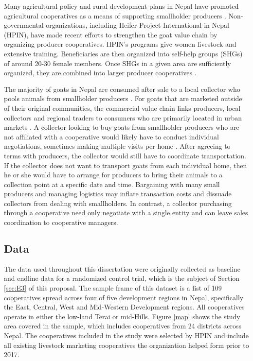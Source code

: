\documentclass[11pt]{article}
\begin{document}
Many agricultural policy and rural development plans in Nepal have promoted agricultural cooperatives as a means of supporting smallholder producers \citep{ADS15}. Non-governmental organizations, including Heifer Project International in Nepal (HPIN), have made recent efforts to strengthen the goat value chain by organizing producer cooperatives. HPIN’s programs give women livestock and extensive training. Beneficiaries are then organized into self-help groups (SHGs) of around 20-30 female members. Once SHGs in a given area are sufficiently organized, they are combined into larger producer cooperatives \citep{janzen-et.al.18}.

The majority of goats in Nepal are consumed after sale to a local collector who pools animals from smallholder producers \citep{HI-N12}. For goats that are marketed outside of their original communities, the commercial value chain links producers, local collectors and regional traders to consumers who are primarily located in urban markets \citep{HI-N12}. A collector looking to buy goats from smallholder producers who are not affiliated with a cooperative would likely have to conduct individual negotiations, sometimes making multiple visits per home \citep{HI-N12, staal-et.al.97}. After agreeing to terms with producers, the collector would still have to coordinate transportation. If the collector does not want to transport goats from each individual home, then he or she would have to arrange for producers to bring their animals to a collection point at a specific date and time. Bargaining with many small producers and managing logistics may inflate transaction costs and dissuade collectors from dealing with smallholders. In contrast, a collector purchasing through a cooperative need only negotiate with a single entity and can leave sales coordination to cooperative managers.

\subsection{Data} \label{sec:data}
The data used throughout this dissertation were originally collected as baseline and endline data for a randomized control trial, which is the subject of Section \ref{sec:E3} of this proposal. The sample frame of this dataset is a list of 109 cooperatives spread across four of five development regions in Nepal, specifically the East, Central, West and Mid-Western Development regions. All cooperatives operate in either the low-land Terai or mid-Hills. Figure \ref{map} shows the study area covered in the sample, which includes cooperatives from 24 districts across Nepal. The cooperatives included in the study were selected by HPIN and include all existing livestock marketing cooperatives the organization helped form prior to 2017.
\end{document}
